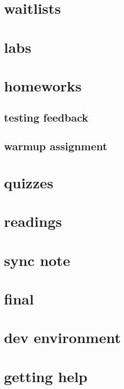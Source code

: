 \section{waitlists}


\section{labs}


\section{homeworks}


\subsection{testing feedback}


\subsection{warmup assignment}


\section{quizzes}


\section{readings}


\section{sync note}


\section{final}


\section{dev environment}


\section{getting help}


